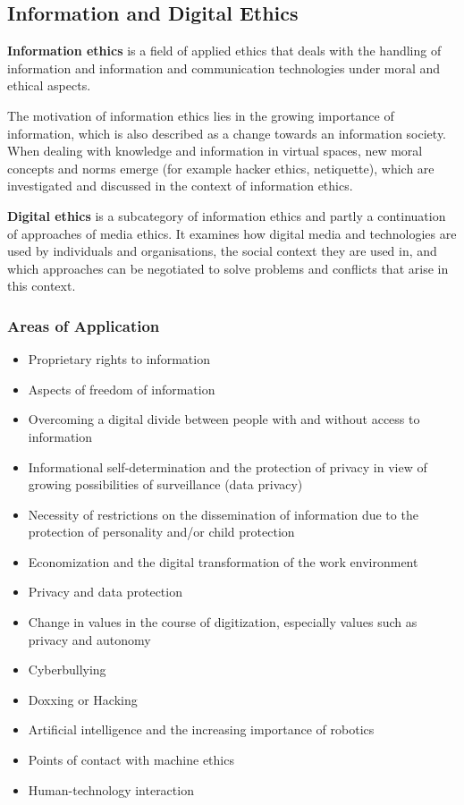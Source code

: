 \documentclass[11pt]{article}
\theoremstyle{definition}
\begin{document}
\subsection{Information and Digital Ethics}
\begin{definition}
	\textbf{Information ethics} is a field of applied ethics that deals with the handling of information and information and communication technologies under moral and ethical aspects.
\end{definition}

The motivation of information ethics lies in the growing importance of information, which is also described as a change towards an information society. When dealing with knowledge and information in virtual spaces, new moral concepts and norms emerge (for example hacker ethics, netiquette), which are investigated and discussed in the context of information ethics.

\begin{definition}
	\textbf{Digital ethics} is a subcategory of information ethics and partly a continuation of approaches of media ethics. It examines how digital media and technologies are used by individuals and organisations, the social context they are used in, and which approaches can be negotiated to solve problems and conflicts that arise in this context.
\end{definition}

\subsubsection{Areas of Application}
\begin{itemize}
	\item Proprietary rights to information
	\item Aspects of freedom of information
	\item Overcoming a digital divide between people with and without access to information
	\item Informational self-determination and the protection of privacy in view of growing possibilities of surveillance (data privacy)
	\item Necessity of restrictions on the dissemination of information due to the protection of personality and/or child protection
	\item Economization and the digital transformation of the work environment
	\item Privacy and data protection
	\item Change in values in the course of digitization, especially values such as privacy and autonomy
	\item Cyberbullying
	\item Doxxing or Hacking
	\item Artificial intelligence and the increasing importance of robotics
	\item Points of contact with machine ethics
	\item Human-technology interaction
\end{itemize}
\end{document}
